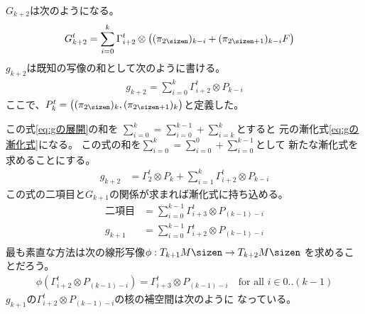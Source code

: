 	$G_{k+2}$は次のようになる。
	\begin{equation}\label{eq:gの展開の行列版}\begin{split} %
		G_{k+2}^t &= \sum_{i=0}^{k} \Gamma_{i+2}^t
			\otimes\bigl((\pi_\myeven)_{k-i} + (\pi_\myodd)_{k-i}F\bigr)
	\end{split}\end{equation} %
	$g_{k+2}$は既知の写像の和として次のように書ける。
	\begin{equation}\label{eq:gの展開}\begin{split} %
		g_{k+2} = \sum_{i=0}^{k}\Gamma_{i+2}^t\otimes P_{k-i}
	\end{split}\end{equation} %
	ここで、$P_k^t=\bigl((\pi_\myeven)_k,(\pi_\myodd)_k\bigr)$と定義した。

	この式\eqref{eq:gの展開}の和を
	$\sum_{i=0}^{k}=\sum_{i=0}^{k-1}+\sum_{i=k}^{k}$とすると
	元の漸化式\eqref{eq:gの漸化式}になる。
	この式の和を$\sum_{i=0}^{k}=\sum_{i=0}^{0}+\sum_{i=0}^{k-1}$として
	新たな漸化式を求めることにする。
	\begin{equation*}\begin{split} %
		g_{k+2} &= \Gamma_2^t\otimes P_k
			+ \sum_{i=1}^{k} \Gamma_{i+2}^t\otimes P_{k-i}
	\end{split}\end{equation*} %
	この式の二項目と$G_{k+1}$の関係が求まれば漸化式に持ち込める。
	\begin{equation*}\begin{split} %
		\text{二項目} &= \sum_{i=0}^{k-1} \Gamma_{i+3}^t\otimes P_{(k-1)-i} \\
		g_{k+1} &= \sum_{i=0}^{k-1} \Gamma_{i+2}^t\otimes P_{(k-1)-i} \\
	\end{split}\end{equation*} %
	最も素直な方法は次の線形写像$\phi:T_{k+1}M\sizen\to T_{k+2}M\sizen$
	を求めることだろう。
	\begin{equation*}\begin{split} %
		\phi(\Gamma_{i+2}^t\otimes P_{(k-1)-i})
			= \Gamma_{i+3}^t\otimes P_{(k-1)-i} \quad\text{for all }i\in0..(k-1)
	\end{split}\end{equation*} %
	$g_{k+1}$の$\Gamma_{i+2}^t\otimes P_{(k-1)-i}$の核の補空間は次のように
	なっている。
